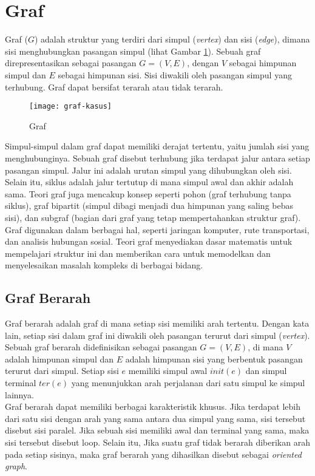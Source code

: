\section{Graf ~\cite{Diestel:17:graph}}
\label{sec:graph}
Graf ($G$) adalah struktur yang terdiri dari simpul (\textit{vertex}) dan sisi (\textit{edge}), dimana sisi menghubungkan pasangan simpul (lihat Gambar \ref{fig:graf}). Sebuah graf direpresentasikan sebagai pasangan $G=(V,E)$, dengan $V$ sebagai himpunan simpul dan $E$ sebagai himpunan sisi. Sisi diwakili oleh pasangan simpul yang terhubung. Graf dapat bersifat terarah atau tidak terarah.
\begin{figure}[h] 
    \centering  
    \texttt{[image: graf-kasus]}  
    \caption{Graf}
    \label{fig:graf} 
\end{figure}
\noindent
Simpul-simpul dalam graf dapat memiliki derajat tertentu, yaitu jumlah sisi yang menghubunginya. Sebuah graf disebut terhubung jika terdapat jalur antara setiap pasangan simpul. Jalur ini adalah urutan simpul yang dihubungkan oleh sisi. Selain itu, siklus adalah jalur tertutup di mana simpul awal dan akhir adalah sama. Teori graf juga mencakup konsep seperti pohon (graf terhubung tanpa siklus), graf bipartit (simpul dibagi menjadi dua himpunan yang saling bebas sisi), dan subgraf (bagian dari graf yang tetap mempertahankan struktur graf).
\\
Graf digunakan dalam berbagai hal, seperti jaringan komputer, rute transportasi, dan analisis hubungan sosial. Teori graf menyediakan dasar matematis untuk mempelajari struktur ini dan memberikan cara untuk memodelkan dan menyelesaikan masalah kompleks di berbagai bidang.

\subsection{Graf Berarah ~\cite{Diestel:17:graph}}
\label{sec:grafberarah}
Graf berarah adalah graf di mana setiap sisi memiliki arah tertentu. Dengan kata lain, setiap sisi dalam graf ini diwakili oleh pasangan terurut dari simpul (\textit{vertex}). Sebuah graf berarah didefinisikan sebagai pasangan $G=(V,E)$, di mana $V$ adalah himpunan simpul dan $E$ adalah himpunan sisi yang berbentuk pasangan terurut dari simpul. Setiap sisi $e$ memiliki simpul awal $init(e)$ dan simpul terminal $ter(e)$ yang menunjukkan arah perjalanan dari satu simpul ke simpul lainnya.
\\
Graf berarah dapat memiliki berbagai karakteristik khusus. Jika terdapat lebih dari satu sisi dengan arah yang sama antara dua simpul yang sama, sisi tersebut disebut sisi paralel. Jika sebuah sisi memiliki awal dan terminal yang sama, maka sisi tersebut disebut loop. Selain itu, Jika suatu graf tidak berarah diberikan arah pada setiap sisinya, maka graf berarah yang dihasilkan disebut sebagai \textit{oriented graph}.

